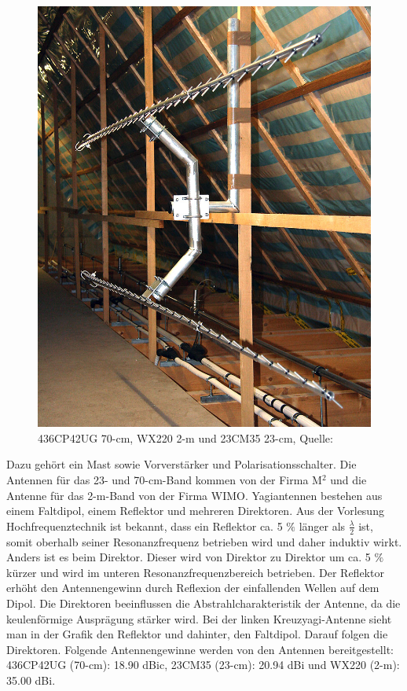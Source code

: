 \begin{figure}[h]
\begin{minipage}[t]{0.34\textwidth}
	\end{minipage}
	\begin{minipage}[t]{0.2\textwidth}
		\includegraphics[width=\textwidth]{images/antenne3}
	\end{minipage}
	\caption[Antennen]{436CP42UG 70-cm, WX220 2-m und 23CM35 23-cm, Quelle: \cite{dk0te}}
	\label{fig: antennen}
\end{figure}
\newpar
Dazu gehört ein Mast sowie Vorverstärker und Polarisationsschalter. Die Antennen für das 23- und 70-cm-Band kommen von der Firma M$^2$ und die 
Antenne für das 2-m-Band von der Firma WIMO. Yagiantennen bestehen aus einem Faltdipol, einem Reflektor und mehreren Direktoren. Aus der Vorlesung 
Hochfrequenztechnik \cite{hfscript} ist bekannt, dass ein Reflektor ca. 5 $\%$ länger als $\frac{\lambda}{2}$ ist, somit oberhalb seiner 
Resonanzfrequenz betrieben wird und daher induktiv wirkt.  Anders ist es beim Direktor. Dieser wird von Direktor zu Direktor um ca. 5 $\%$ kürzer und 
wird im unteren Resonanzfrequenzbereich betrieben. Der Reflektor erhöht den Antennengewinn durch Reflexion der einfallenden Wellen auf dem Dipol. Die 
Direktoren beeinflussen die Abstrahlcharakteristik der Antenne, da die keulenförmige Ausprägung stärker wird. Bei der linken Kreuzyagi-Antenne sieht 
man in der Grafik den Reflektor und dahinter, den Faltdipol. Darauf folgen die Direktoren. Folgende Antennengewinne werden von den Antennen 
bereitgestellt: 436CP42UG (70-cm): 18.90 dBic, 23CM35 (23-cm): 20.94 dBi und WX220 (2-m): 35.00 dBi.

